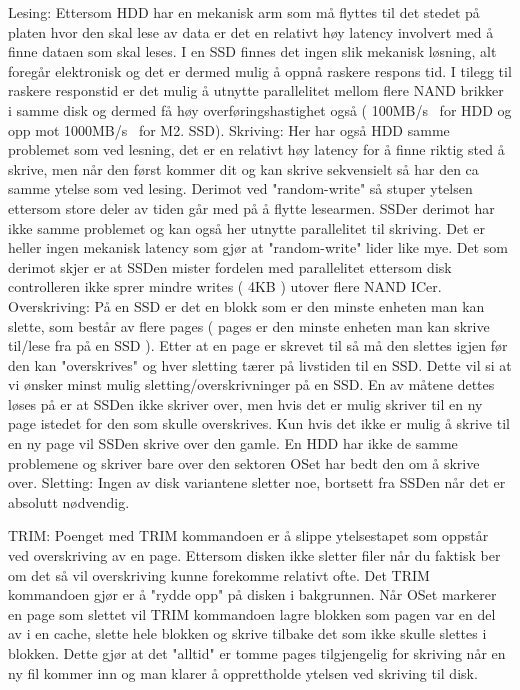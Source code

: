 \documentclass[9pt]{article}
\begin{document}
Lesing:
Ettersom HDD har en mekanisk arm som må flyttes til det stedet på platen hvor den skal lese av data er det en relativt høy latency involvert med å finne dataen som skal leses. I en SSD finnes det ingen slik mekanisk løsning, alt foregår elektronisk og det er dermed mulig å oppnå raskere respons tid. I tilegg til raskere responstid er det mulig å utnytte parallelitet mellom flere NAND brikker i samme disk og dermed få høy overføringshastighet også ( 100MB/s~ for HDD og opp mot 1000MB/s~ for M2. SSD).
Skriving:
Her har også HDD samme problemet som ved lesning, det er en relativt høy latency for å finne riktig sted å skrive, men når den først kommer dit og kan skrive sekvensielt så har den ca samme ytelse som ved lesing. Derimot ved "random-write" så stuper ytelsen ettersom store deler av tiden går med på å flytte lesearmen. SSDer derimot har ikke samme problemet og kan også her utnytte parallelitet til skriving. Det er heller ingen mekanisk latency som gjør at "random-write" lider like mye. Det som derimot skjer er at SSDen mister fordelen med parallelitet ettersom disk controlleren ikke sprer mindre writes ( 4KB ) utover flere NAND ICer. 
Overskriving:
På en SSD er det en blokk som er den minste enheten man kan slette, som består av flere pages ( pages er den minste enheten man kan skrive til/lese fra på en SSD ). Etter at en page er skrevet til så må den slettes igjen før den kan "overskrives" og hver sletting tærer på livstiden til en SSD. Dette vil si at vi ønsker minst mulig sletting/overskrivninger på en SSD. En av måtene dettes løses på er at SSDen ikke skriver over, men hvis det er mulig skriver til en ny page istedet for den som skulle overskrives. Kun hvis det ikke er mulig å skrive til en ny page vil SSDen skrive over den gamle.
En HDD har ikke de samme problemene og skriver bare over den sektoren OSet har bedt den om å skrive over.
Sletting:
Ingen av disk variantene sletter noe, bortsett fra SSDen når det er absolutt nødvendig.

TRIM:
Poenget med TRIM kommandoen er å slippe ytelsestapet som oppstår ved overskriving av en page. Ettersom disken ikke sletter filer når du faktisk ber om det så vil overskriving kunne forekomme relativt ofte. Det TRIM kommandoen gjør er å "rydde opp" på disken i bakgrunnen. Når OSet markerer en page som slettet vil TRIM kommandoen lagre blokken som pagen var en del av i en cache, slette hele blokken og skrive tilbake det som ikke skulle slettes i blokken. Dette gjør at det "alltid" er tomme pages tilgjengelig for skriving når en ny fil kommer inn og man klarer å opprettholde ytelsen ved skriving til disk.
\end{document}
